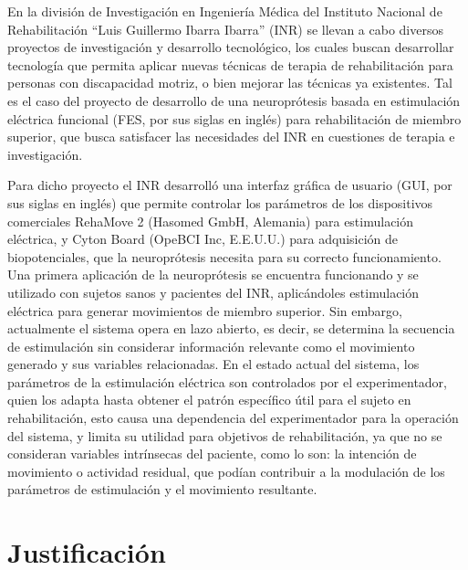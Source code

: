 
En la división de Investigación en Ingeniería Médica del Instituto Nacional de Rehabilitación ``Luis Guillermo Ibarra Ibarra'' (INR) se llevan a cabo diversos proyectos de investigación y desarrollo tecnológico, los cuales buscan desarrollar tecnología que permita aplicar nuevas técnicas de terapia de rehabilitación para personas con discapacidad motriz, o bien mejorar las técnicas ya existentes. Tal es el caso del proyecto de desarrollo de una neuroprótesis basada en estimulación eléctrica funcional (FES, por sus siglas en inglés) para rehabilitación de miembro superior, que busca satisfacer las necesidades del INR en cuestiones de terapia e investigación.

Para dicho proyecto el INR desarrolló una interfaz gráfica de usuario (GUI, por sus siglas en inglés) que permite controlar los parámetros de los dispositivos comerciales RehaMove 2 (Hasomed GmbH, Alemania) para estimulación eléctrica, y Cyton Board (OpeBCI Inc, E.E.U.U.) para adquisición de biopotenciales, que la neuroprótesis necesita para su correcto funcionamiento. Una primera aplicación de la neuroprótesis se encuentra funcionando y se utilizado con sujetos sanos y pacientes del INR, aplicándoles estimulación eléctrica para generar movimientos de miembro superior. Sin embargo, actualmente el sistema opera en lazo abierto, es decir, se determina la secuencia de estimulación sin considerar información relevante como el movimiento generado y sus variables relacionadas. En el estado actual del sistema, los parámetros de la estimulación eléctrica son controlados por el experimentador, quien los adapta hasta obtener el patrón específico útil para el sujeto en rehabilitación, esto causa una dependencia del experimentador para la operación del sistema, y limita su utilidad para objetivos de rehabilitación, ya que no se consideran variables intrínsecas del paciente, como lo son: la intención de movimiento o actividad residual, que podían contribuir a la modulación de los parámetros de estimulación y el movimiento resultante.


\section{Justificación}

